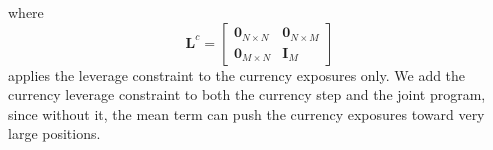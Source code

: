 where
\begin{equation*}
    \bm{L}^c = \begin{bmatrix} \bm{0}_{N \times N} & \bm{0}_{N \times M} \\ \bm{0}_{M \times N} & \bm{I}_M \end{bmatrix}
\end{equation*}
applies the leverage constraint to the currency exposures only. We add the currency leverage constraint to both the
currency step and the joint program, since without it, the mean term can push the currency exposures
toward very large positions.

